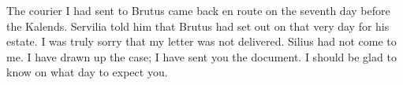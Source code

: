 

 The courier I had sent to Brutus came back en route on the seventh day before the Kalends. Servilia told him that Brutus had set out on that very day for \dag his estate\dag. I was truly sorry that my letter was not delivered. Silius had not come to me. I have drawn up the case; I have sent you the document. I should be glad to know on what day to expect you.
